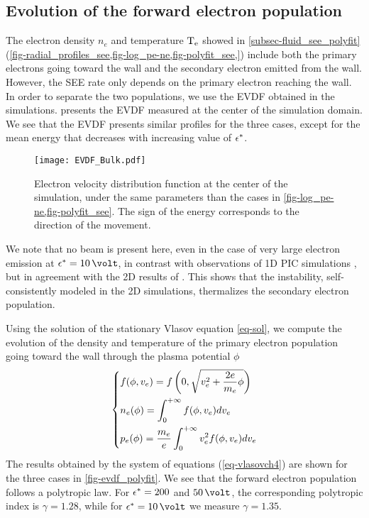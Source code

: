 \subsection{Evolution of the forward electron population} \label{subsec-EVDF_see_polyfit}

The electron density $n_e$ and  temperature $\mathrm{T_e}$ showed in \cref{subsec-fluid_see_polyfit} (\cref{fig-radial_profiles_see,fig-log_pe-ne,fig-polyfit_see,}) include both the primary electrons going toward the wall and the secondary electron emitted from the wall.
However, the \ac{SEE} rate only depends on the primary electron reaching the wall.
In order to separate the two populations, we use the \ac{EVDF} obtained in the simulations.
 presents the \ac{EVDF} measured at the center of the simulation domain. 
We see that the \ac{EVDF} presents similar profiles for the three cases, except for the mean energy that decreases with increasing value of $\epsilon^{*}$.
\begin{figure}[!hbt]
  \centering
  \texttt{[image: EVDF\_Bulk.pdf]}
  \caption{Electron velocity distribution function at the center of the simulation, under the same parameters than the cases in \cref{fig-log_pe-ne,fig-polyfit_see}. The sign of the energy corresponds to the direction of the movement.}
  \label{fig-evdf_epsstar}
\end{figure}

We note that no beam is present here, even in the case of very large electron emission at $\crover=10\,\volt$, in contrast with observations of \ac{1D} PIC simulations \citep{sydorenko2006b,sydorenko2007}, but in agreement with the \ac{2D} results of \citet{heron2013}.
This shows that the instability, self-consistently modeled in the \ac{2D} simulations, thermalizes the secondary electron population.

Using the solution of the stationary Vlasov equation \cref{eq-sol}, we compute the evolution of the density and temperature of the primary electron population going toward the wall through the plasma potential $\phi$ 
\begin{equation} \label{eq-vlasovch4}
  \begin{dcases}
    f(\phi, v_e) = f \left( 0, \sqrt{v_e^2 + \frac{2 e}{m_e} \phi} \right) \\
    n_e(\phi) = \int_0^{+\infty} f(\phi, v_e) dv_e \\
    p_e(\phi) = \frac{m_e}{e} \int_0^{+\infty} v_e^2 f(\phi, v_e) dv_e \\
  \end{dcases}
\end{equation}
The results obtained by the system of equations (\ref{eq-vlasovch4}) are shown for the three cases in \cref{fig-evdf_polyfit}.
We see that the forward electron population follows a polytropic law.
For $\epsilon^{*}= 200$ and $50\,\volt$, the corresponding polytropic index is $\gamma=1.28$, while for $\crover= 10\,\volt$ we measure $\gamma=1.35$.

